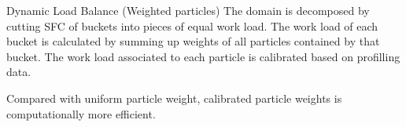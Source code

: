 \documentclass{beamer}
\begin{document}
\begin{frame}{Dynamic Load Balance (Weighted particles)}
The domain is decomposed by cutting SFC of buckets into pieces of equal work load. The work load of each bucket is calculated by summing up weights of all particles contained by that bucket. The work load associated to each particle is calibrated based on profilling data.
\begin{table}
      \label{tab:Computational_cost_steps}
\end{table}
Compared with uniform particle weight, calibrated particle weights is computationally more efficient.
\begin{table}
      \label{tab:effect-of-weighted-particle}
\end{table}

\end{frame}
\end{document}
